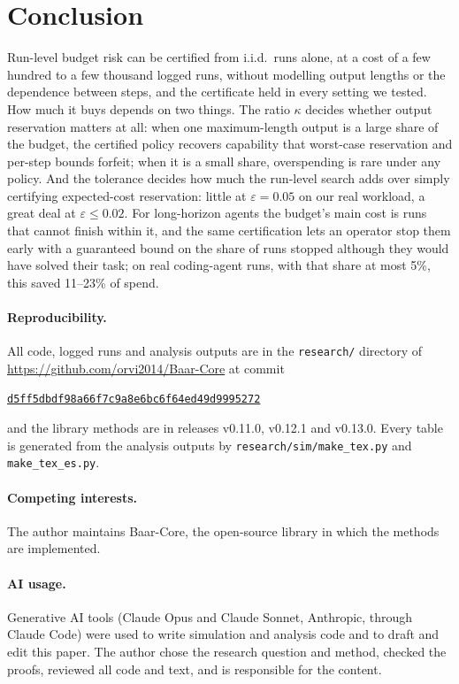 \documentclass[11pt]{article}
\theoremstyle{remark}
\begin{document}
\section{Conclusion}

Run-level budget risk can be certified from i.i.d.\ runs alone, at a cost of a
few hundred to a few thousand logged runs, without modelling output lengths or
the dependence between steps, and the certificate held in every setting we
tested. How much it buys depends on two things. The ratio $\kappa$ decides
whether output reservation matters at all: when one maximum-length output is a
large share of the budget, the certified policy recovers capability that
worst-case reservation and per-step bounds forfeit; when it is a small share,
overspending is rare under any policy. And the tolerance decides how much the
run-level search adds over simply certifying expected-cost reservation: little
at $\varepsilon = 0.05$ on our real workload, a great deal at
$\varepsilon \le 0.02$. For long-horizon agents the budget's main cost is runs that
cannot finish within it, and the same certification lets an operator stop them
early with a guaranteed bound on the share of runs stopped although they would
have solved their task; on real coding-agent runs, with that share at most 5\%,
this saved 11--23\% of spend.

\paragraph{Reproducibility.} All code, logged runs and analysis outputs are in
the \texttt{research/} directory of \url{https://github.com/orvi2014/Baar-Core}
at commit
\begin{center}
\small\href{https://github.com/orvi2014/Baar-Core/tree/d5ff5dbdf98a66f7c9a8e6bc6f64ed49d9995272/research}{\texttt{d5ff5dbdf98a66f7c9a8e6bc6f64ed49d9995272}}
\end{center}
and the library methods are in releases v0.11.0, v0.12.1 and v0.13.0. Every table is generated from the
analysis outputs by \texttt{research/sim/make\_tex.py} and
\texttt{make\_tex\_es.py}.

\paragraph{Competing interests.} The author maintains Baar-Core, the
open-source library in which the methods are implemented.

\paragraph{AI usage.} Generative AI tools (Claude Opus and Claude Sonnet,
Anthropic, through Claude Code) were used to write simulation and analysis code
and to draft and edit this paper. The author chose the research question and
method, checked the proofs, reviewed all code and text, and is responsible for
the content.



\end{document}
